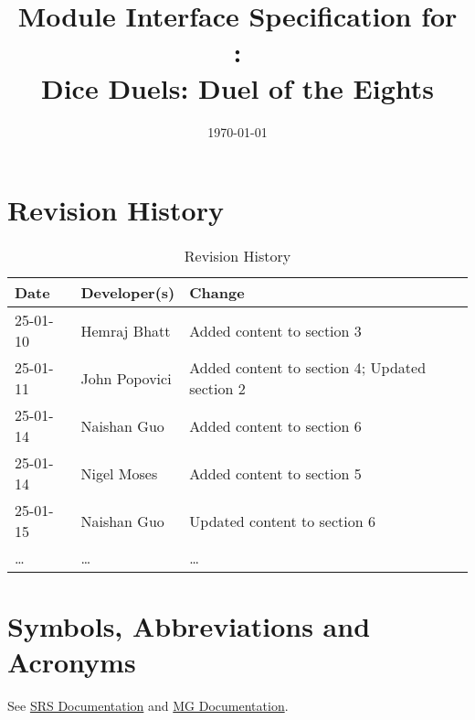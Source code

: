 \documentclass[12pt, titlepage]{article}
\begin{document}
\title{Module Interface Specification for\\\progname:\\Dice Duels: Duel of the Eights}

\author{\authname}

\date{\today}

\maketitle


\section{Revision History}

\begin{table}[hp]
\caption{Revision History} \label{TblRevisionHistory}
\begin{tabularx}{\textwidth}{llX}
\toprule
\textbf{Date} & \textbf{Developer(s)} & \textbf{Change}\\
\midrule
25-01-10 & Hemraj Bhatt & Added content to section 3\\
25-01-11 & John Popovici & Added content to section 4; Updated section 2\\
25-01-14 & Naishan Guo & Added content to section 6\\
25-01-14 & Nigel Moses & Added content to section 5\\
25-01-15 & Naishan Guo & Updated content to section 6\\
\dots & \dots & \dots\\
\bottomrule
\end{tabularx}
\end{table}


\newpage

\tableofcontents

\newpage


\section{Symbols, Abbreviations and Acronyms}

See \href{https://github.com/John-Popovici/duel-of-the-eights/blob/main/docs/SRS/SRS.pdf}{SRS Documentation} and \href{file:///C:/Users/a/Documents/Coding/duel-of-the-eights/docs/Design/SoftArchitecture/MG.pdf}{MG Documentation}.

\end{document}
